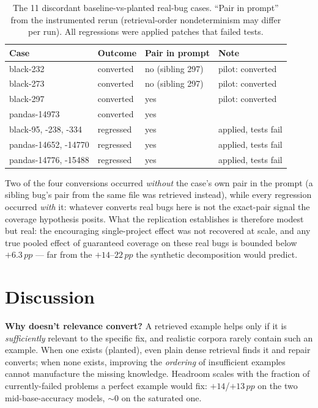 \documentclass[10pt,conference]{IEEEtran}
\newcommand{\pp}{\,pp}
\begin{document}
\begin{table}[!t]
\caption{The 11 discordant baseline-vs-planted real-bug cases. ``Pair in
prompt'' from the instrumented rerun (retrieval-order nondeterminism may
differ per run). All regressions were applied patches that failed tests.}
\label{tab:discordant}
\centering
\footnotesize
\begin{tabular}{@{}llll@{}}
\toprule
Case & Outcome & Pair in prompt & Note \\
\midrule
black-232 & converted & no (sibling 297) & pilot: converted \\
black-273 & converted & no (sibling 297) & pilot: converted \\
black-297 & converted & yes & pilot: converted \\
pandas-14973 & converted & yes & \\
black-95, -238, -334 & regressed & yes & applied, tests fail \\
pandas-14652, -14770 & regressed & yes & applied, tests fail \\
pandas-14776, -15488 & regressed & yes & applied, tests fail \\
\bottomrule
\end{tabular}
\end{table}

Two of the four conversions occurred \emph{without} the case's own pair in
the prompt (a sibling bug's pair from the same file was retrieved instead),
while every regression occurred \emph{with} it: whatever converts real bugs
here is not the exact-pair signal the coverage hypothesis posits.
What the replication establishes is therefore modest but real:
the encouraging single-project effect was not recovered at scale, and any
true pooled effect of guaranteed coverage on these real bugs is bounded
below $+6.3\pp$ --- far from the $+14$--$22\pp$ the synthetic
decomposition would predict.

\section{Discussion}
\label{sec:discussion}

\textbf{Why doesn't relevance convert?} A retrieved example helps only if it
is \emph{sufficiently} relevant to the specific fix, and realistic corpora
rarely contain such an example. When one exists (planted), even plain dense
retrieval finds it and repair converts; when none exists, improving the
\emph{ordering} of insufficient examples cannot manufacture the missing
knowledge. Headroom scales with the fraction of currently-failed problems a
perfect example would fix: $+14$/$+13\pp$ on the two mid-base-accuracy
models, ${\sim}0$ on the saturated one.
\end{document}
